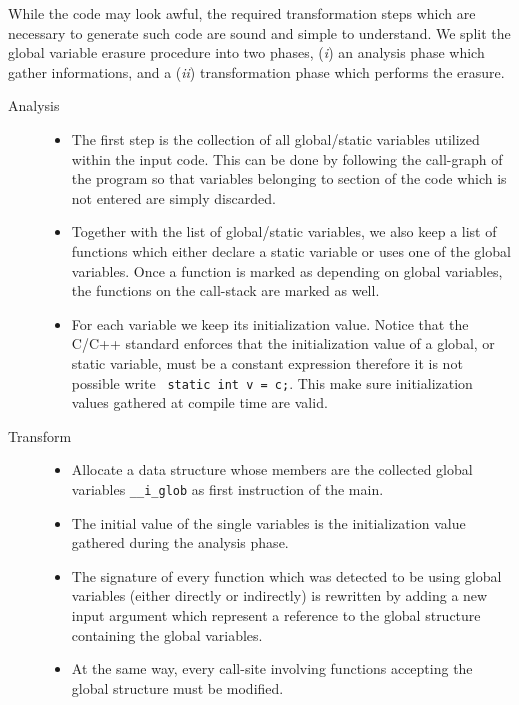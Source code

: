 While the code may look awful, the required transformation steps which are
necessary to generate such code are sound and simple to understand. We split the
global variable erasure procedure into two phases, (\emph{i}) an analysis phase
which gather informations, and a (\emph{ii}) transformation phase which performs
the erasure.
\begin{description}
\item [Analysis]
	\begin{itemize}
	\item The first step is the collection of all global/static variables utilized
	within the input code. This can be done by following the call-graph of the program
	so that variables belonging to section of the code which is not entered are simply
	discarded. 
	
	\item Together with the list of global/static variables, we also keep a list of
	functions which either declare a static variable or uses one of the global
	variables. Once a function is marked as depending on global variables,
	the functions on the call-stack are marked as well.

	\item For each variable we keep its initialization value. Notice that the
	C/C++ standard enforces that the initialization value of a global, or static
	variable, must be a constant expression therefore it is not possible write {\tt
	static int v = c;}. This make sure initialization values gathered at compile
	time are valid.
	\end{itemize}

\item[Transform] 
	\begin{itemize}
	\item Allocate a data structure whose members are the collected global
	variables {\tt \_\_i\_glob} as first instruction of the main.

	\item The initial value of the single variables is the initialization value
	gathered during the analysis phase. 

	\item The signature of every function which was detected to be using global
	variables (either directly or indirectly) is rewritten by adding a new input
	argument which represent a reference to the global structure containing the
	global variables.

	\item At the same way, every call-site involving functions accepting the
	global structure must be modified.	
	\end{itemize}
\end{description}


